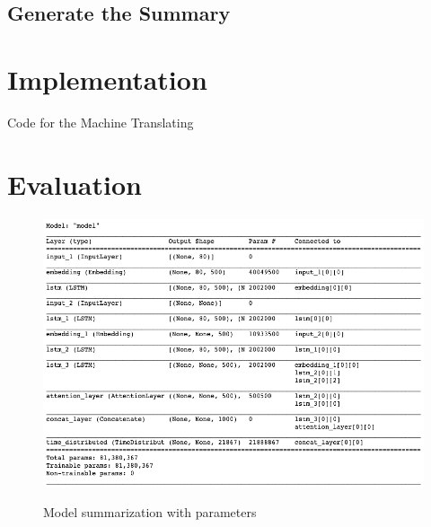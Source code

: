 \subsection{Generate the Summary}


\section{Implementation}\label{ss:imp}

Code for the Machine Translating

\section{Evaluation}\label{ss:eval}


\begin{figure}
	\begin{center}
		\includegraphics[width=6in]{photos/model_sum}\\
		\caption{Model summarization with parameters}\label{model_sum}
	\end{center}
\end{figure}

